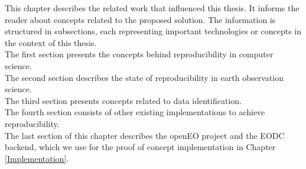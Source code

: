 \documentclass[draft,final]{vutinfth} %
\begin{document}
This chapter describes the related work that influenced this thesis. It informs the reader about concepts related to the proposed solution. The information is structured in subsections, each representing important technologies or concepts in the context of this thesis. \\The first section presents the concepts behind reproducibility in computer science. \\
The second section describes the state of reproducibility in earth observation science. \\
The third section presents concepts related to data identification. \\ 
The fourth section consists of other existing implementations to achieve reproducibility. \\
The last section of this chapter describes the openEO project and the EODC backend, which we use for the proof of concept implementation in Chapter \ref{Implementation}.      
\end{document}

